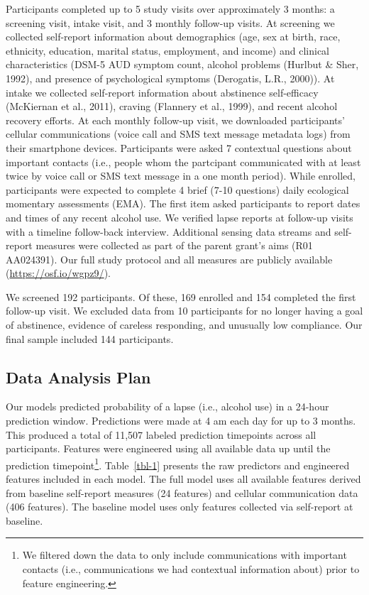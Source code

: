 \documentclass[
  letterpaper,
  DIV=11,
  numbers=noendperiod]{scrartcl}
\begin{document}
Participants completed up to 5 study visits over approximately 3 months:
a screening visit, intake visit, and 3 monthly follow-up visits. At
screening we collected self-report information about demographics (age,
sex at birth, race, ethnicity, education, marital status, employment,
and income) and clinical characteristics (DSM-5 AUD symptom count,
alcohol problems (Hurlbut \& Sher, 1992), and presence of psychological
symptoms (Derogatis, L.R., 2000)). At intake we collected self-report
information about abstinence self-efficacy (McKiernan et al., 2011),
craving (Flannery et al., 1999), and recent alcohol recovery efforts. At
each monthly follow-up visit, we downloaded participants' cellular
communications (voice call and SMS text message metadata logs) from
their smartphone devices. Participants were asked 7 contextual questions
about important contacts (i.e., people whom the partcipant communicated
with at least twice by voice call or SMS text message in a one month
period). While enrolled, participants were expected to complete 4 brief
(7-10 questions) daily ecological momentary assessments (EMA). The first
item asked participants to report dates and times of any recent alcohol
use. We verified lapse reports at follow-up visits with a timeline
follow-back interview. Additional sensing data streams and self-report
measures were collected as part of the parent grant's aims (R01
AA024391). Our full study protocol and all measures are publicly
available (\url{https://osf.io/wgpz9/}).

We screened 192 participants. Of these, 169 enrolled and 154 completed
the first follow-up visit. We excluded data from 10 participants for no
longer having a goal of abstinence, evidence of careless responding, and
unusually low compliance. Our final sample included 144 participants.

\subsection{Data Analysis Plan}\label{data-analysis-plan}

Our models predicted probability of a lapse (i.e., alcohol use) in a
24-hour prediction window. Predictions were made at 4 am each day for up
to 3 months. This produced a total of 11,507 labeled prediction
timepoints across all participants. Features were engineered using all
available data up until the prediction timepoint\footnote{We filtered
  down the data to only include communications with important contacts
  (i.e., communications we had contextual information about) prior to
  feature engineering.}. Table~\ref{tbl-1} presents the raw predictors
and engineered features included in each model. The full model uses all
available features derived from baseline self-report measures (24
features) and cellular communication data (406 features). The baseline
model uses only features collected via self-report at baseline.
\end{document}
